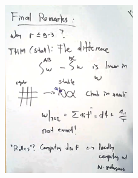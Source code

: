 	\begin{figure}[!ht]
	\centering
	\includegraphics[width=0.5\textwidth]{../images/im45.png}
	\end{figure}


























